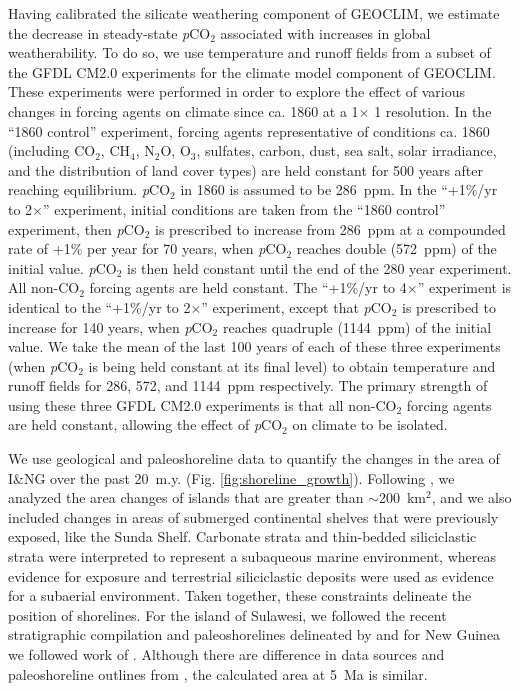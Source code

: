 \documentclass[11pt,letterpaper]{article}
\newcommand{\degrees}{\textdegree\xspace}
\newcommand{\pCOtwo}{\textit{p}CO$_{2}$\xspace}
\newcommand{\COtwo}{CO$_{2}$\xspace}
\begin{document}
Having calibrated the silicate weathering component of GEOCLIM, we estimate the decrease in steady-state \pCOtwo associated with increases in global weatherability. To do so, we use temperature and runoff fields from a subset of the GFDL CM2.0 experiments \citep{Delworth2006a, Delworth2006b} for the climate model component of GEOCLIM. These experiments were performed in order to explore the effect of various changes in forcing agents on climate since ca. 1860 at a 1\degrees $\times$ 1\degrees resolution. In the ``1860 control'' experiment, forcing agents representative of conditions ca. 1860 (including \COtwo, CH$_{4}$, N$_{2}$O, O$_{3}$, sulfates, carbon, dust, sea salt, solar irradiance, and the distribution of land cover types) are held constant for 500 years after reaching equilibrium. \pCOtwo in 1860 is assumed to be 286~ppm. In the ``+1\%/yr to 2$\times$'' experiment, initial conditions are taken from the ``1860 control'' experiment, then \pCOtwo is prescribed to increase from 286~ppm at a compounded rate of +1\% per year for 70 years, when \pCOtwo reaches double (572~ppm) of the initial value. \pCOtwo is then held constant until the end of the 280 year experiment. All non-\COtwo forcing agents are held constant. The ``+1\%/yr to 4$\times$'' experiment is identical to the ``+1\%/yr to 2$\times$'' experiment, except that \pCOtwo is prescribed to increase for 140 years, when \pCOtwo reaches quadruple (1144~ppm) of the initial value. We take the mean of the last 100 years of each of these three experiments (when \pCOtwo is being held constant at its final level) to obtain temperature and runoff fields for 286, 572, and 1144~ppm respectively. The primary strength of using these three GFDL CM2.0 experiments is that all non-\COtwo forcing agents are held constant, allowing the effect of \pCOtwo on climate to be isolated.

We use geological and paleoshoreline data to quantify the changes in the area of I\&NG over the past 20~m.y. (Fig. \ref{fig:shoreline_growth}). Following \citet{Molnar2015a}, we analyzed the area changes of islands that are greater than $\sim$200~km$^{2}$, and we also included changes in areas of submerged continental shelves that were previously exposed, like the Sunda Shelf. Carbonate strata and thin-bedded siliciclastic strata were interpreted to represent a subaqueous marine environment, whereas evidence for exposure and terrestrial siliciclastic deposits were used as evidence for a subaerial environment. Taken together, these constraints delineate the position of shorelines. For the island of Sulawesi, we followed the recent stratigraphic compilation and paleoshorelines delineated by \citet{Nugraha2018a} and for New Guinea we followed work of \citet{Norwick2003a, Harrington2017a, Gold2017a}. Although there are difference in data sources and paleoshoreline outlines from \cite{Molnar2015a}, the calculated area at 5~Ma is similar.
\end{document}
